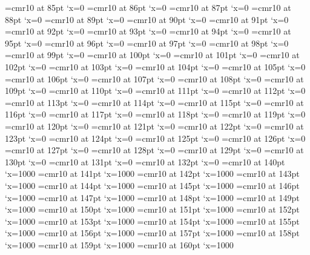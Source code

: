 \font\F=cmr10 at 85pt \lpcode\F`x=0
\font\F=cmr10 at 86pt \lpcode\F`x=0
\font\F=cmr10 at 87pt \lpcode\F`x=0
\font\F=cmr10 at 88pt \lpcode\F`x=0
\font\F=cmr10 at 89pt \lpcode\F`x=0
\font\F=cmr10 at 90pt \lpcode\F`x=0
\font\F=cmr10 at 91pt \lpcode\F`x=0
\font\F=cmr10 at 92pt \lpcode\F`x=0
\font\F=cmr10 at 93pt \lpcode\F`x=0
\font\F=cmr10 at 94pt \lpcode\F`x=0
\font\F=cmr10 at 95pt \lpcode\F`x=0
\font\F=cmr10 at 96pt \lpcode\F`x=0
\font\F=cmr10 at 97pt \lpcode\F`x=0
\font\F=cmr10 at 98pt \lpcode\F`x=0
\font\F=cmr10 at 99pt \lpcode\F`x=0
\font\F=cmr10 at 100pt \lpcode\F`x=0
\font\F=cmr10 at 101pt \lpcode\F`x=0
\font\F=cmr10 at 102pt \lpcode\F`x=0
\font\F=cmr10 at 103pt \lpcode\F`x=0
\font\F=cmr10 at 104pt \lpcode\F`x=0
\font\F=cmr10 at 105pt \lpcode\F`x=0
\font\F=cmr10 at 106pt \lpcode\F`x=0
\font\F=cmr10 at 107pt \lpcode\F`x=0
\font\F=cmr10 at 108pt \lpcode\F`x=0
\font\F=cmr10 at 109pt \lpcode\F`x=0
\font\F=cmr10 at 110pt \lpcode\F`x=0
\font\F=cmr10 at 111pt \lpcode\F`x=0
\font\F=cmr10 at 112pt \lpcode\F`x=0
\font\F=cmr10 at 113pt \lpcode\F`x=0
\font\F=cmr10 at 114pt \lpcode\F`x=0
\font\F=cmr10 at 115pt \lpcode\F`x=0
\font\F=cmr10 at 116pt \lpcode\F`x=0
\font\F=cmr10 at 117pt \lpcode\F`x=0
\font\F=cmr10 at 118pt \lpcode\F`x=0
\font\F=cmr10 at 119pt \lpcode\F`x=0
\font\F=cmr10 at 120pt \lpcode\F`x=0
\font\F=cmr10 at 121pt \lpcode\F`x=0
\font\F=cmr10 at 122pt \lpcode\F`x=0
\font\F=cmr10 at 123pt \lpcode\F`x=0
\font\F=cmr10 at 124pt \lpcode\F`x=0
\font\F=cmr10 at 125pt \lpcode\F`x=0
\font\F=cmr10 at 126pt \lpcode\F`x=0
\font\F=cmr10 at 127pt \lpcode\F`x=0
\font\F=cmr10 at 128pt \lpcode\F`x=0
\font\F=cmr10 at 129pt \lpcode\F`x=0
\font\F=cmr10 at 130pt \lpcode\F`x=0
\font\F=cmr10 at 131pt \lpcode\F`x=0
\font\F=cmr10 at 132pt \lpcode\F`x=0
\font\F=cmr10 at 140pt \efcode\F`x=1000
\font\F=cmr10 at 141pt \efcode\F`x=1000
\font\F=cmr10 at 142pt \efcode\F`x=1000
\font\F=cmr10 at 143pt \efcode\F`x=1000
\font\F=cmr10 at 144pt \efcode\F`x=1000
\font\F=cmr10 at 145pt \efcode\F`x=1000
\font\F=cmr10 at 146pt \efcode\F`x=1000
\font\F=cmr10 at 147pt \efcode\F`x=1000
\font\F=cmr10 at 148pt \efcode\F`x=1000
\font\F=cmr10 at 149pt \efcode\F`x=1000
\font\F=cmr10 at 150pt \efcode\F`x=1000
\font\F=cmr10 at 151pt \efcode\F`x=1000
\font\F=cmr10 at 152pt \efcode\F`x=1000
\font\F=cmr10 at 153pt \efcode\F`x=1000
\font\F=cmr10 at 154pt \efcode\F`x=1000
\font\F=cmr10 at 155pt \efcode\F`x=1000
\font\F=cmr10 at 156pt \efcode\F`x=1000
\font\F=cmr10 at 157pt \efcode\F`x=1000
\font\F=cmr10 at 158pt \efcode\F`x=1000
\font\F=cmr10 at 159pt \efcode\F`x=1000
\font\F=cmr10 at 160pt \efcode\F`x=1000
